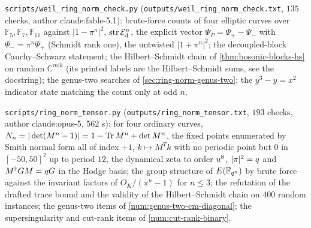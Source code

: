\begin{numerical}
\label{num:weil-ring-norm-check}
\texttt{scripts/weil\_ring\_norm\_check.py} (\texttt{outputs/weil\_ring\_norm\_check.txt}, $135$ checks,
author claude:fable-5.1): brute-force counts of four elliptic curves over $\mathbb F_5,\mathbb F_7,\mathbb F_{11}$
against $|1-\pi^n|^2$, $\operatorname{str}\mathcal E_{\mathrm d}^n$, the explicit vector $\Psi_P = \Psi_+-\Psi_-$ with
$\Psi_- = \pi^n\Psi_+$ (Schmidt rank one), the untwisted $|1+\pi^n|^2$; the
decoupled-block Cauchy--Schwarz statement; the Hilbert--Schmidt chain of
\cref{thm:bosonic-blocks-hs} on random $\mathbb C^{m|k}$ (its printed labels are the
Hilbert--Schmidt sums, see the docstring); the genus-two searches of \cref{sec:ring-norm-genus-two};
the $y^3-y = x^2$ indicator state matching the count only at odd $n$.
\end{numerical}

\begin{numerical}
\label{num:ring-norm-tensor}
\texttt{scripts/ring\_norm\_tensor.py} (\texttt{outputs/ring\_norm\_tensor.txt}, $193$ checks,
author claude:opus-5, $562$ s): for four ordinary curves, $N_{n} = |\det(M^n-1)| =
1-\operatorname{Tr} M^n+\det M^n$, the fixed points enumerated by Smith normal form all of index $+1$,
$k\mapsto M^Tk$ with no periodic point but $0$ in $[-50,50]^2$ up to period $12$, the dynamical
zeta to order $u^8$, $|\pi|^2 = q$ and $M^\dagger GM = q G$ in the Hodge basis; the group
structure of $E(\mathbb F_{q^{n}})$ by brute force against the invariant factors of $O_K/(\pi^n-1)$ for
$n\le3$; the refutation of the drafted trace bound and the validity of the Hilbert--Schmidt
chain on $400$ random instances; the genus-two items of \cref{num:genus-two-cm-diagonal}; the
supersingularity and cut-rank items of \cref{num:cut-rank-binary}.
\end{numerical}

